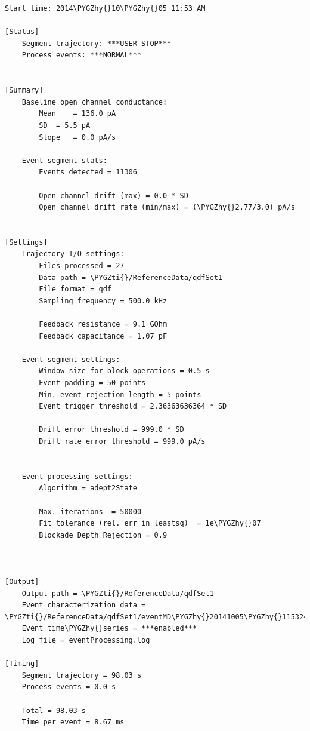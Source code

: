 \documentclass[letterpaper,10pt,english]{sphinxmanual}
\def\PYGZhy{\char`\-}
\def\PYGZti{\char`\~}
\begin{document}
\begin{Verbatim}[commandchars=\\\{\}]
Start time: 2014\PYGZhy{}10\PYGZhy{}05 11:53 AM

[Status]
    Segment trajectory: ***USER STOP***
    Process events: ***NORMAL***


[Summary]
    Baseline open channel conductance:
        Mean    = 136.0 pA
        SD  = 5.5 pA
        Slope   = 0.0 pA/s

    Event segment stats:
        Events detected = 11306

        Open channel drift (max) = 0.0 * SD
        Open channel drift rate (min/max) = (\PYGZhy{}2.77/3.0) pA/s


[Settings]
    Trajectory I/O settings:
        Files processed = 27
        Data path = \PYGZti{}/ReferenceData/qdfSet1
        File format = qdf
        Sampling frequency = 500.0 kHz

        Feedback resistance = 9.1 GOhm
        Feedback capacitance = 1.07 pF

    Event segment settings:
        Window size for block operations = 0.5 s
        Event padding = 50 points
        Min. event rejection length = 5 points
        Event trigger threshold = 2.36363636364 * SD

        Drift error threshold = 999.0 * SD
        Drift rate error threshold = 999.0 pA/s


    Event processing settings:
        Algorithm = adept2State

        Max. iterations  = 50000
        Fit tolerance (rel. err in leastsq)  = 1e\PYGZhy{}07
        Blockade Depth Rejection = 0.9



[Output]
    Output path = \PYGZti{}/ReferenceData/qdfSet1
    Event characterization data = \PYGZti{}/ReferenceData/qdfSet1/eventMD\PYGZhy{}20141005\PYGZhy{}115324.sqlite
    Event time\PYGZhy{}series = ***enabled***
    Log file = eventProcessing.log

[Timing]
    Segment trajectory = 98.03 s
    Process events = 0.0 s

    Total = 98.03 s
    Time per event = 8.67 ms
\end{Verbatim}
\end{document}
